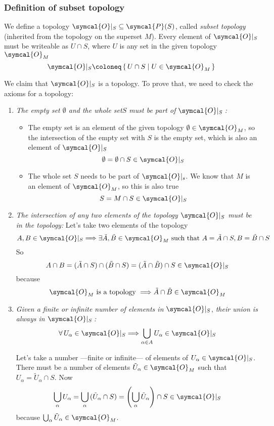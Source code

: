  \subsubsection{Definition of subset topology}
 We define a topology $\symcal{O}|_S \subseteq \symcal{P} (S)$, called
 \emph{subset topology} (inherited from the topology on the superset $M$).
 Every element of $\symcal{O}|_S$ must be writeable as $U\cap S$, where $U$ is any set
 in the given topology $\symcal{O}_M$
 \[
   \symcal{O}|_S \coloneq \set{U\cap S | U\in\symcal{O}_M}
 \]
 
 We claim that $\symcal{O}|_S$ is a topology. To prove that, we need to check the
 axioms for a topology:
 \begin{enumerate}
 \item \emph{The empty set $\emptyset$ and the whole set$S$ must be part of
     $\symcal{O}|_S$\,:}
   \begin{itemize}
   \item The empty set is an element of the given topology $\emptyset\in\symcal{O}_M$,
     so the intersection of the empty set with $S$ is the empty set, which is also an
     element of $\symcal{O}|_S$
   \[
     \emptyset = \emptyset\cap S \in \symcal{O}|_S
   \]

 \item The whole set $S$ needs to be part of $\symcal{O}|_s$. We know that $M$ is an
   element of $\symcal{O}_M$, so this is also true
   \[
     S = M\cap S \in \symcal{O}|_S
   \]
   \end{itemize}

 \item \emph {The intersection of any two elements of the topology} $\symcal{O}|_S$
   \emph{must be in the topology:}
   Let's take two elements of the topology
   \[
     A, B\in\symcal{O}|_S
     \Longrightarrow
     \exists \tilde{A}, \tilde{B}\in\symcal{O}_M
     \text{ such that }
     A = \tilde{A}\cap S, B = \tilde{B}\cap S
   \]
   So
   \[
     A\cap B = (\tilde{A}\cap S) \cap (\tilde{B}\cap S)
     = (\tilde{A}\cap\tilde{B})\cap S \in\symcal{O}|_S
   \]
   because
   \[
     \symcal{O}_M \text{ is a topology } \Longrightarrow \tilde{A}\cap\tilde{B}\in
     \symcal{O}_M
   \]

 \item \emph{Given a finite or infinite number of elements in} $\symcal{O}|_S$,
   \emph{their union is always in $\symcal{O}|_S$\,:}
   \begin{equation}
     \forall\, U_\alpha \in \symcal{O}|_S
     \Longrightarrow
     \bigcup_{\alpha\in A} U_\alpha \in \symcal{O}|_S
   \end{equation}

   Let's take a number ---finite or infinite--- of elements of
   $U_\alpha\in\symcal{O}|_S$.
   There must be a number of elements $\tilde{U}_\alpha\in\symcal{O}_M$ such that
   $U_\alpha = \tilde{U}_\alpha \cap S$.
   Now
   \[
     \bigcup_\alpha U_\alpha
     = \bigcup_\alpha \,(\tilde{U}_\alpha\cap S)
     = \left(\bigcup_\alpha \tilde{U}_\alpha\right) \cap S\in\symcal{O}|_S
   \]
   because $\bigcup_\alpha \tilde{U}_\alpha\in\symcal{O}_M$.
 \end{enumerate}

